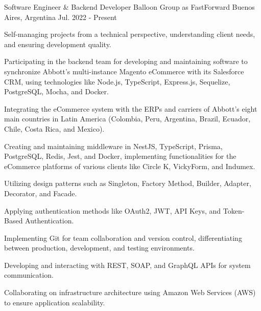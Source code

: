 

\begin{cventries}

\vspace{2mm}
\cventry
    {Software Engineer \& Backend Developer} %
    {Balloon Group as FastForward} %
    {Buenos Aires, Argentina} %
    {Jul. 2022 - Present} %
    {
      \begin{cvitems} %
        \item {Self-managing projects from a technical perspective, understanding client needs, and ensuring development quality.}
        \item {Participating in the backend team for developing and maintaining software to synchronize Abbott's multi-instance Magento eCommerce with its Salesforce CRM, using technologies like Node.js, TypeScript, Express.js, Sequelize, PostgreSQL, Mocha, and Docker.}
        \item {Integrating the eCommerce system with the ERPs and carriers of Abbott's eight main countries in Latin America (Colombia, Peru, Argentina, Brazil, Ecuador, Chile, Costa Rica, and Mexico).}
        \item {Creating and maintaining middleware in NestJS, TypeScript, Prisma, PostgreSQL, Redis, Jest, and Docker, implementing functionalities for the eCommerce platforms of various clients like Circle K, VickyForm, and Indumex.}
        \item {Utilizing design patterns such as Singleton, Factory Method, Builder, Adapter, Decorator, and Facade.}
        \item {Applying authentication methods like OAuth2, JWT, API Keys, and Token-Based Authentication.}
        \item {Implementing Git for team collaboration and version control, differentiating between production, development, and testing environments.}
        \item {Developing and interacting with REST, SOAP, and GraphQL APIs for system communication.}
        \item {Collaborating on infrastructure architecture using Amazon Web Services (AWS) to ensure application scalability.}

\end{cvitems}}
\end{cventries}
